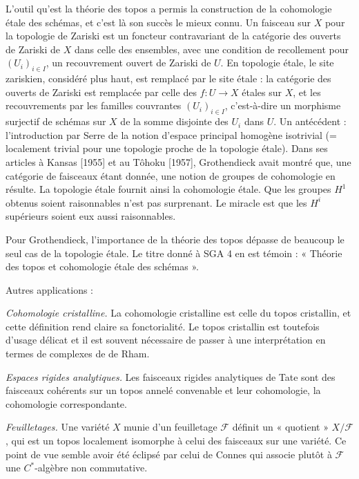 \documentclass[11pt]{article}
\begin{document}
L'outil qu'est la théorie des topos a permis la construction de la cohomologie étale des schémas, et c'est là son succès le mieux connu. Un faisceau sur \(X\) pour la topologie de Zariski est un foncteur contravariant de la catégorie des ouverts de Zariski de \(X\) dans celle des ensembles, avec une condition de recollement pour \((U_i)_{i\in I}\), un recouvrement ouvert de Zariski de \(U\). En topologie étale, le site zariskien, considéré plus haut, est remplacé par le site étale : la catégorie des ouverts de Zariski est remplacée par celle des \(f:U\to X\) étales sur \(X\), et les recouvrements par les familles couvrantes \((U_i)_{i\in I}\), c'est-à-dire un morphisme surjectif de schémas sur \(X\) de la somme disjointe des \(U_i\) dans \(U\). Un antécédent : l'introduction par Serre de la notion d'espace principal homogène isotrivial (= localement trivial pour une topologie proche de la topologie étale). Dans ses articles à Kansas [1955] et au Tôhoku [1957], Grothendieck avait montré que, une catégorie de faisceaux étant donnée, une notion de groupes de cohomologie en résulte. La topologie étale fournit ainsi la cohomologie étale. Que les groupes \(H^1\) obtenus soient raisonnables n'est pas surprenant. Le miracle est que les \(H^i\) supérieurs soient eux aussi raisonnables.

Pour Grothendieck, l'importance de la théorie des topos dépasse de beaucoup le seul cas de la topologie étale. Le titre donné à SGA 4 en est témoin : « Théorie des topos et cohomologie étale des schémas ».

Autres applications :

\begin{description}[leftmargin=2.6em,labelwidth=2em]
\item[(A)] \emph{Cohomologie cristalline.} La cohomologie cristalline est celle du topos cristallin, et cette définition rend claire sa fonctorialité. Le topos cristallin est toutefois d'usage délicat et il est souvent nécessaire de passer à une interprétation en termes de complexes de de Rham.
\item[(B)] \emph{Espaces rigides analytiques.} Les faisceaux rigides analytiques de Tate sont des faisceaux cohérents sur un topos annelé convenable et leur cohomologie, la cohomologie correspondante.
\item[(C)] \emph{Feuilletages.} Une variété \(X\) munie d'un feuilletage \(\mathcal F\) définit un « quotient » \(X/\mathcal F\), qui est un topos localement isomorphe à celui des faisceaux sur une variété. Ce point de vue semble avoir été éclipsé par celui de Connes qui associe plutôt à \(\mathcal F\) une \(C^*\)-algèbre non commutative.
\end{description}
\end{document}
